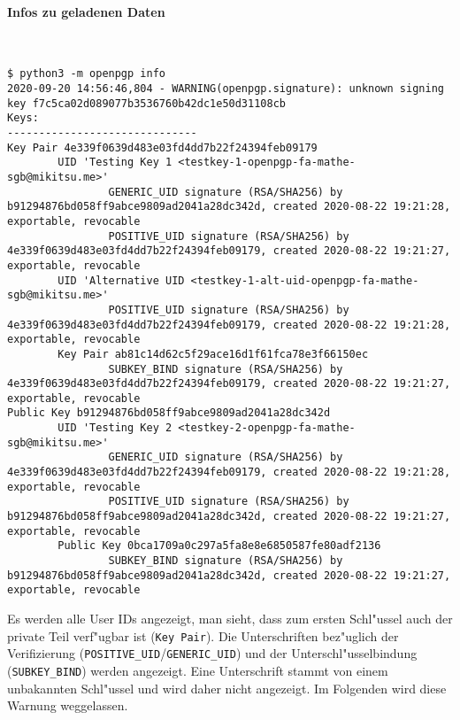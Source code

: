 \documentclass[12pt]{article}
\begin{document}
\paragraph{Infos zu geladenen Daten}~
\begin{lstlisting}
$ python3 -m openpgp info
2020-09-20 14:56:46,804 - WARNING(openpgp.signature): unknown signing key f7c5ca02d089077b3536760b42dc1e50d31108cb
Keys:
------------------------------
Key Pair 4e339f0639d483e03fd4dd7b22f24394feb09179
        UID 'Testing Key 1 <testkey-1-openpgp-fa-mathe-sgb@mikitsu.me>'
                GENERIC_UID signature (RSA/SHA256) by b91294876bd058ff9abce9809ad2041a28dc342d, created 2020-08-22 19:21:28, exportable, revocable
                POSITIVE_UID signature (RSA/SHA256) by 4e339f0639d483e03fd4dd7b22f24394feb09179, created 2020-08-22 19:21:27, exportable, revocable
        UID 'Alternative UID <testkey-1-alt-uid-openpgp-fa-mathe-sgb@mikitsu.me>'
                POSITIVE_UID signature (RSA/SHA256) by 4e339f0639d483e03fd4dd7b22f24394feb09179, created 2020-08-22 19:21:28, exportable, revocable
        Key Pair ab81c14d62c5f29ace16d1f61fca78e3f66150ec
                SUBKEY_BIND signature (RSA/SHA256) by 4e339f0639d483e03fd4dd7b22f24394feb09179, created 2020-08-22 19:21:27, exportable, revocable
Public Key b91294876bd058ff9abce9809ad2041a28dc342d
        UID 'Testing Key 2 <testkey-2-openpgp-fa-mathe-sgb@mikitsu.me>'
                GENERIC_UID signature (RSA/SHA256) by 4e339f0639d483e03fd4dd7b22f24394feb09179, created 2020-08-22 19:21:28, exportable, revocable
                POSITIVE_UID signature (RSA/SHA256) by b91294876bd058ff9abce9809ad2041a28dc342d, created 2020-08-22 19:21:27, exportable, revocable
        Public Key 0bca1709a0c297a5fa8e8e6850587fe80adf2136
                SUBKEY_BIND signature (RSA/SHA256) by b91294876bd058ff9abce9809ad2041a28dc342d, created 2020-08-22 19:21:27, exportable, revocable
\end{lstlisting}

Es werden alle User IDs angezeigt, man sieht, dass zum ersten Schl"ussel auch der private Teil verf"ugbar ist (\texttt{Key Pair}).
Die Unterschriften bez"uglich der Verifizierung (\texttt{POSITIVE\_UID}/\texttt{GENERIC\_UID})
und der Unterschl"usselbindung (\texttt{SUBKEY\_BIND}) werden angezeigt.
Eine Unterschrift stammt von einem unbakannten Schl"ussel und wird daher nicht angezeigt.
Im Folgenden wird diese Warnung weggelassen.
\end{document}
